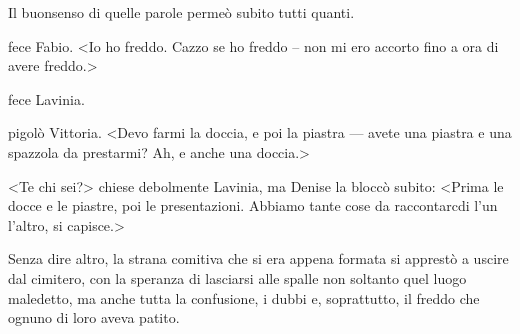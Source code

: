 Il buonsenso di quelle parole permeò subito tutti quanti.

 fece Fabio. \textless{}Io ho freddo. Cazzo se ho freddo -- non mi ero
accorto fino a ora di avere freddo.\textgreater{}

 fece Lavinia.

 pigolò Vittoria. \textless{}Devo farmi la doccia, e poi la piastra ---
avete una piastra e una spazzola da prestarmi? Ah, e anche una
doccia.\textgreater{}

\textless{}Te chi sei?\textgreater{} chiese debolmente Lavinia, ma
Denise la bloccò subito: \textless{}Prima le docce e le piastre, poi le
presentazioni. Abbiamo tante cose da raccontarcdi l'un l'altro, si
capisce.\textgreater{}

Senza dire altro, la strana comitiva che si era appena formata si
apprestò a uscire dal cimitero, con la speranza di lasciarsi alle spalle
non soltanto quel luogo maledetto, ma anche tutta la confusione, i dubbi
e, soprattutto, il freddo che ognuno di loro aveva patito.
